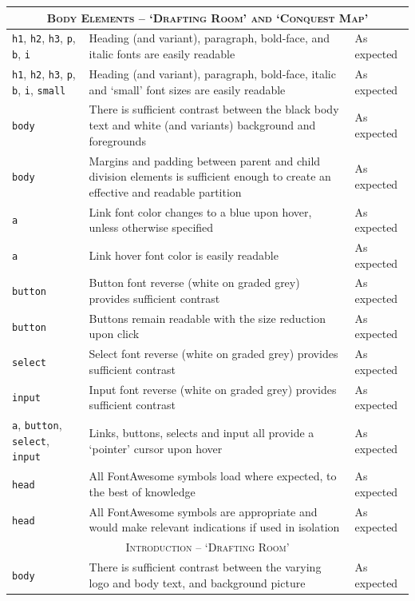 \documentclass[11pt, english]{article}
\begin{document}
\begin{center}
\begin{longtable}{p{3cm}p{8cm}p{2cm}}
		\multicolumn{3}{c}{\textsc{Body Elements -- `Drafting Room' and `Conquest Map'}}\\
		\hline
		\texttt{h1}, \texttt{h2}, \texttt{h3}, \texttt{p}, \texttt{b}, \texttt{i} & Heading (and variant), paragraph, bold-face, and italic fonts are easily readable & As expected\\
		\texttt{h1}, \texttt{h2}, \texttt{h3}, \texttt{p}, \texttt{b}, \texttt{i}, \texttt{small} & Heading (and variant), paragraph, bold-face, italic and `small' font sizes are easily readable & As expected\\
		\texttt{body} & There is sufficient contrast between the black body text and white (and variants) background and foregrounds & As expected\\
		\texttt{body} & Margins and padding between parent and child division elements is sufficient enough to create an effective and readable partition & As expected\\
		\texttt{a} & Link font color changes to a blue upon hover, unless otherwise specified & As expected\\
		\texttt{a} & Link hover font color is easily readable & As expected\\
		\texttt{button} & Button font reverse (white on graded grey) provides sufficient contrast & As expected\\
		\texttt{button} & Buttons remain readable with the size reduction upon click & As expected\\
		\texttt{select} & Select font reverse (white on graded grey) provides sufficient contrast & As expected\\
		\texttt{input} & Input font reverse (white on graded grey) provides sufficient contrast & As expected\\
		\texttt{a}, \texttt{button}, \texttt{select}, \texttt{input} & Links, buttons, selects and input all provide a `pointer' cursor upon hover & As expected\\
		\texttt{head} & All FontAwesome symbols load where expected, to the best of knowledge & As expected\\
		\texttt{head} & All FontAwesome symbols are appropriate and would make relevant indications if used in isolation & As expected\\
		\hline
		\multicolumn{3}{c}{\textsc{Introduction -- `Drafting Room'}}\\
		\hline
		\texttt{body} & There is sufficient contrast between the varying logo and body text, and background picture & As expected\\

\end{longtable}
\end{center}
\end{document}
